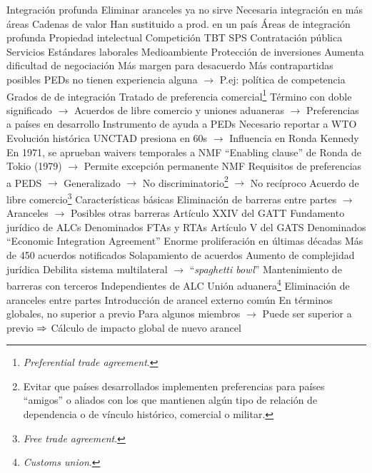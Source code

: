 \documentclass{nuevotema}
\begin{document}
\begin{esquemal}
			\3 Integración profunda
				\4 Eliminar aranceles ya no sirve
				\4[] Necesaria integración en más áreas
				\4 Cadenas de valor
				\4[] Han sustituido a prod. en un país
				\4 Áreas  de integración profunda
				\4[] Propiedad intelectual
				\4[] Competición
				\4[] TBT
				\4[] SPS
				\4[] Contratación pública
				\4[] Servicios
				\4[] Estándares laborales
				\4[] Medioambiente
				\4[] Protección de inversiones
				\4 Aumenta dificultad de negociación
				\4[] Más margen para desacuerdo
				\4[] Más contrapartidas posibles
				\4[] PEDs no tienen experiencia alguna
				\4[] $\to$ P.ej: política de competencia
		\2 Grados de de integración
			\3 Tratado de preferencia comercial\footnote{\textit{Preferential trade agreement}.}
				\4 Término con doble significado
				\4[] $\to$ Acuerdos de libre comercio y uniones aduaneras
				\4[] $\to$ Preferencias a países en desarrollo
				\4 Instrumento de ayuda a PEDs
				\4 Necesario reportar a WTO
				\4 Evolución histórica
				\4[] UNCTAD presiona en 60s
				\4[] $\to$ Influencia en Ronda Kennedy
				\4[] En 1971, se aprueban waivers temporales a NMF
				\4[] ``Enabling clause'' de Ronda de Tokio (1979)
				\4[] $\to$ Permite excepción permanente NMF
				\4 Requisitos de preferencias a PEDS
				\4[] $\to$ Generalizado
				\4[] $\to$ No discriminatorio\footnote{Evitar que países desarrollados implementen preferencias para países ``amigos'' o aliados con los que mantienen algún tipo de relación de dependencia o de vínculo histórico, comercial o militar.}
				\4[] $\to$ No recíproco
			\3 Acuerdo de libre comercio\footnote{\textit{Free trade agreement}.}
				\4 Características básicas
				\4[] Eliminación de barreras entre partes
				\4[] $\to$ Aranceles
				\4[] $\to$ Posibles otras barreras
				\4 Artículo XXIV del GATT
				\4[] Fundamento jurídico de ALCs
				\4[] Denominados FTAs y RTAs
				\4 Artículo V del GATS
				\4[] Denominados ``Economic Integration Agreement''
				\4 Enorme proliferación en últimas décadas
				\4[] Más de 450 acuerdos notificados
				\4[] Solapamiento de acuerdos
				\4[] Aumento de complejidad jurídica
				\4[] Debilita sistema multilateral
				\4[] $\to$ ``\textit{spaghetti bowl}''
				\4 Mantenimiento de barreras con terceros
				\4[] Independientes de ALC
			\3 Unión aduanera\footnote{\textit{Customs union}.}
				\4[] Eliminación de aranceles entre partes
				\4[] Introducción de arancel externo común
				\4[] En términos globales, no superior a previo
				\4[] Para algunos miembros
				\4[] $\to$ Puede ser superior a previo
				\4[] $\Rightarrow$ Cálculo de impacto global de nuevo arancel

\end{esquemal}
\end{document}
